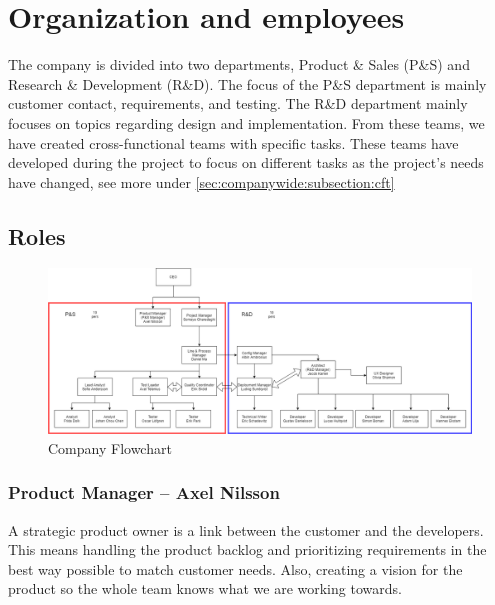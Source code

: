 \section{Organization and employees}
\label{sec:companywide}

The company is divided into two departments, Product \& Sales (P\&S) and Research \& Development (R\&D). The focus of the P\&S department is mainly customer contact, requirements, and testing. The R\&D department mainly focuses on topics regarding design and implementation. From these teams, we have created cross-functional teams with specific tasks. These teams have developed during the project to focus on different tasks as the project's needs have changed, see more under \ref{sec:companywide:subsection:cft} %
\subsection{Roles}
\begin{figure}[ht]
    \centering\includegraphics[width=1 \linewidth]{figures/company flowchart.png}
    \caption{Company Flowchart}
    \label{fig:example2}
\end{figure}


\subsubsection*{Product Manager – Axel Nilsson}
A strategic product owner is a link between the customer and the developers. This means handling the product backlog and prioritizing requirements in the best way possible to match customer needs. Also, creating a vision for the product so the whole team knows what we are working towards. 


